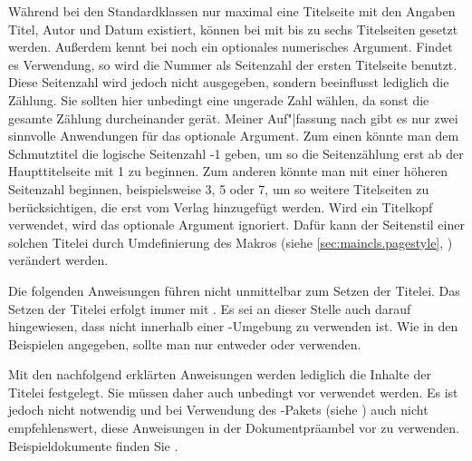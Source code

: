 \begin{Declaration}
\end{Declaration}%
Während bei den Standardklassen
nur maximal eine Titelseite mit den Angaben Titel, Autor und Datum existiert, können bei {\KOMAScript} mit
 bis zu sechs Titelseiten gesetzt werden.
\iffalse %
Im Gegensatz zu den Standardklassen %
\else %
Außerdem %
\fi %
kennt  bei {\KOMAScript}
\iffalse %
außerdem %
\fi %
noch ein optionales numerisches Argument.  Findet es Verwendung, so wird die
Nummer als Seitenzahl der ersten Titelseite benutzt.  Diese Seitenzahl wird
jedoch nicht ausgegeben, sondern beeinflusst lediglich die Zählung. Sie
sollten hier unbedingt eine ungerade Zahl wählen, da sonst die gesamte Zählung
durcheinander gerät. Meiner Auf"|fassung nach gibt es nur zwei sinnvolle
Anwendungen für das optionale Argument. Zum einen könnte man dem
Schmutztitel die logische Seitenzahl -1 geben,
um so die Seitenzählung erst ab der Haupttitelseite mit 1 zu beginnen. Zum
anderen könnte man mit einer höheren Seitenzahl beginnen, beispielsweise 3, 5
oder 7, um so weitere Titelseiten zu berücksichtigen, die erst vom Verlag
hinzugefügt werden. Wird ein Titelkopf verwendet, wird das optionale Argument
ignoriert. Dafür kann der Seitenstil einer solchen Titelei durch Umdefinierung
des Makros %
 (siehe
\autoref{sec:maincls.pagestyle}, )
verändert werden.

Die folgenden Anweisungen führen nicht unmittelbar zum Setzen der Titelei. Das
Setzen der Titelei erfolgt immer mit . Es sei an dieser
Stelle auch darauf hingewiesen, dass  nicht innerhalb einer
-Umgebung zu verwenden
ist. Wie in den
Beispielen angegeben, sollte man nur
entweder  oder 
verwenden.

Mit den nachfolgend erklärten Anweisungen werden lediglich die Inhalte der
Titelei festgelegt. Sie müssen daher auch unbedingt vor 
verwendet werden. Es ist jedoch nicht notwendig und bei Verwendung des
-Pakets (siehe \cite{package:babel}) auch
nicht empfehlenswert, diese Anweisungen in der Dokumentpräambel vor
 zu verwenden.  Beispieldokumente finden Sie
.



